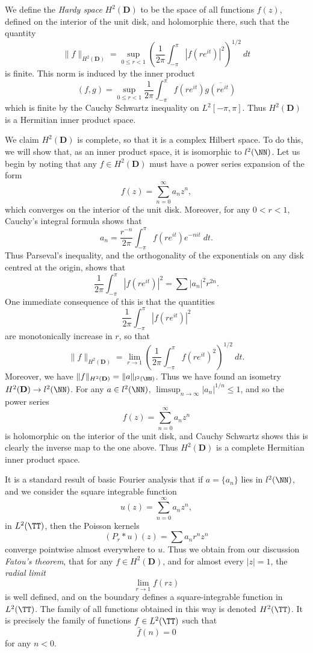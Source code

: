 \begin{example}
    We define the \emph{Hardy space} $H^2(\mathbf{D})$ to be the space of all functions $f(z)$, defined on the interior of the unit disk, and holomorphic there, such that the quantity
    \[ \| f \|_{H^2(\mathbf{D})} = \sup_{0 \leq r < 1} \left( \frac{1}{2\pi} \int_{-\pi}^\pi |f(re^{it})|^2 \right)^{1/2} \ dt \]
    is finite. This norm is induced by the inner product
    \[ (f,g) = \sup_{0 \leq r < 1} \frac{1}{2\pi} \int_{-\pi}^\pi f(re^{it}) \overline{g(re^{it})} \]
    which is finite by the Cauchy Schwartz inequality on $L^2[-\pi,\pi]$. Thus $H^2(\mathbf{D})$ is a Hermitian inner product space.

    We claim $H^2(\mathbf{D})$ is complete, so that it is a complex Hilbert space. To do this, we will show that, as an inner product space, it is isomorphic to $l^2(\NN)$. Let us begin by noting that any $f \in H^2(\mathbf{D})$ must have a power series expansion of the form
    \[ f(z) = \sum_{n = 0}^\infty a_n z^n, \]
    which converges on the interior of the unit disk. Moreover, for any $0 < r < 1$, Cauchy's integral formula shows that
    \[ a_n = \frac{r^{-n}}{2 \pi} \int_{-\pi}^\pi f(re^{it}) e^{-nit}\; dt. \]
    Thus Parseval's inequality, and the orthogonality of the exponentials on any disk centred at the origin, shows that
    \[ \frac{1}{2\pi} \int_{-\pi}^\pi |f(re^{it})|^2 = \sum |a_n|^2 r^{2n}. \]
    One immediate consequence of this is that the quantities
    \[ \frac{1}{2\pi} \int_{-\pi}^\pi |f(re^{it})|^2 \]
    are monotonically increase in $r$, so that
    \[ \| f \|_{H^2(\mathbf{D})} = \lim_{r \to 1} \left( \frac{1}{2\pi} \int_{-\pi}^\pi f(re^{it})^2 \right)^{1/2} \ dt. \]
    Moreover, we have $\| f \|_{H^2(\mathbf{D})} = \| a \|_{l^2(\NN)}$. Thus we have found an isometry $H^2(\mathbf{D}) \to l^2(\NN)$. For any $a \in l^2(\NN)$, $\limsup_{n \to \infty} |a_n|^{1/n} \leq 1$, and so the power series
    \[ f(z) = \sum_{n = 0}^\infty a_n z^n \]
    is holomorphic on the interior of the unit disk, and Cauchy Schwartz shows this is clearly the inverse map to the one above. Thus $H^2(\mathbf{D})$ is a complete Hermitian inner product space.

    It is a standard result of basic Fourier analysis that if $a = \{ a_n \}$ lies in $l^2(\NN)$, and we consider the square integrable function
    \[ u(z) = \sum_{n = 0}^\infty a_n z^n, \]
    in $L^2(\TT)$, then the Poisson kernels
    \[ (P_r * u)(z) = \sum a_n r^n z^n \]
    converge pointwise almost everywhere to $u$. Thus we obtain from our discussion \emph{Fatou's theorem}, that for any $f \in H^2(\mathbf{D})$, and for almost every $|z| = 1$, the \emph{radial limit}
    \[ \lim_{r \to 1} f(rz) \]
    is well defined, and on the boundary defines a square-integrable function in $L^2(\TT)$. The family of all functions obtained in this way is denoted $H^2(\TT)$. It is precisely the family of functions $f \in L^2(\TT)$ such that
    \[ \widehat{f}(n) = 0 \]
    for any $n < 0$.


\end{example}
